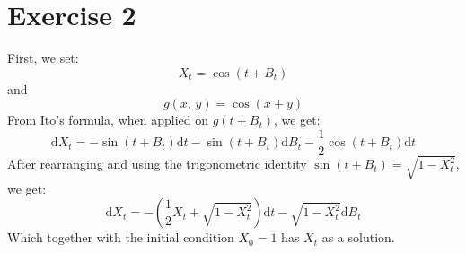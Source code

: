 \documentclass{amsart}
\theoremstyle{plain}
\theoremstyle{definition}
\theoremstyle{definition}
\theoremstyle{remark}
\newcommand{\diff}{\mathrm{d}}
\begin{document}
        \section{Exercise 2}
        First, we set:
        \begin{equation*}
            X_{t} = \cos \left(t + B_{t}\right)
        \end{equation*}
        and
        \begin{equation*}
            g \left(x,\,y\right) = \cos \left(x + y\right)
        \end{equation*}
        From Ito's formula, when applied on \(g \left(t+B_{t}\right)\), we get:
        \begin{equation*}
            \diff  X_{t} = -\sin \left(t + B_{t}\right) \diff t -\sin \left(t + B_{t}\right) \diff  B_{t} - \frac{1}{2} \cos \left(t + B_{t}\right) \diff t
        \end{equation*}
        After rearranging and using the trigonometric identity \(\sin \left(t + B_{t}\right) = \sqrt{1-X_{t}^{2}}\), we get:
        \begin{equation*}
            \diff X_{t} = -\left(\frac{1}{2}X_{t}+\sqrt{1-X_{t}^{2}}\right)\diff t - \sqrt{1-X_{t}^{2}}\diff B_{t}
        \end{equation*}
        Which together with the initial condition \(X_{0}=1\) has \(X_{t}\) as a solution.
\end{document}
